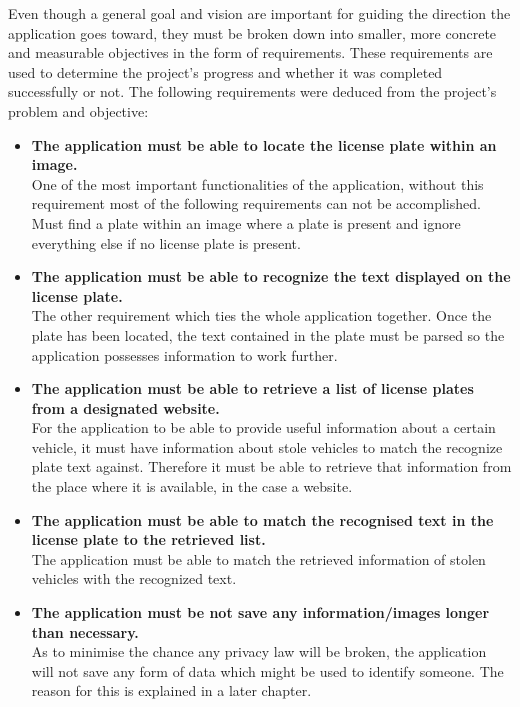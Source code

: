 
Even though a general goal and vision are important for guiding the direction the application goes toward, they must be broken down into smaller, more concrete and measurable objectives in the form of requirements. These requirements are used to determine the project’s progress and whether it was completed successfully or not. The following requirements were deduced from the project’s problem and objective:

\begin{itemize}
    \item{\textbf{The application must be able to locate the license plate within an image.} \\
        One of the most important functionalities of the application, without this requirement most of the following requirements can not be accomplished. Must find a plate within an image where a plate is present and ignore everything else if no license plate is present.        
    }

    \item{\textbf{The application must be able to recognize the text displayed on the license plate.} \\
        The other requirement which ties the whole application together. Once the plate has been located, the text contained in the plate must be parsed so the application possesses information to work further. 
    }

    \item{\textbf{The application must be able to retrieve a list of license plates from a designated website.} \\
         For the application to be able to provide useful information about a certain vehicle, it must have information about stole vehicles to match the recognize plate text against. Therefore it must be able to retrieve that information from the place where it is available, in the case a website.
    }

    \item{\textbf{The application must be able to match the recognised text in the license plate to the retrieved list.} \\
        The application must be able to match the retrieved information of stolen vehicles with the recognized text.
    }

    \item{\textbf{The application must be not save any information/images longer than necessary.} \\
        As to minimise the chance any privacy law will be broken, the application will not save any form of data which might be used to identify someone. The reason for this is explained in a later chapter.
    }
\end{itemize}

